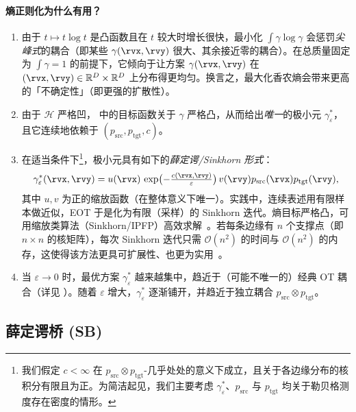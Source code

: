 \paragraph{熵正则化为什么有用？}
\begin{enumerate}
  \item {}
  由于 $t\mapsto t\log t$ 是凸函数且在 $t$ 较大时增长很快，最小化 $\int \gamma\log\gamma$
  会惩罚\emph{尖峰式}的耦合（即某些 $\gamma(\rvx,\rvy)$ 很大、其余接近零的耦合）。在总质量固定为 $\int \gamma=1$ 的前提下，它倾向于让方案 $\gamma(\rvx,\rvy)$ 在 $(\rvx,\rvy)\in\mathbb{R}^D\times\mathbb{R}^D$ 上分布得更均匀。换言之，最大化香农熵会带来更高的「不确定性」（即更强的扩散性）。

  \item {}
  由于 $\mathcal{H}$ 严格凹， 中的目标函数关于 $\gamma$ 严格凸，从而给出\emph{唯一}的极小元 $\gamma^*_\varepsilon$，且它连续地依赖于 $(p_{\mathrm{src}},p_{\mathrm{tgt}},c)$。

  \item {}
  在适当条件下\footnote{我们假定 $c<\infty$ 在 $p_{\mathrm{src}}\otimes p_{\mathrm{tgt}}$-几乎处处的意义下成立，且关于各边缘分布的核积分有限且为正。为简洁起见，我们主要考虑 $\gamma^*_\varepsilon$、$p_{\mathrm{src}}$ 与 $p_{\mathrm{tgt}}$ 均关于勒贝格测度存在密度的情形。}，极小元具有如下的\emph{薛定谔/Sinkhorn 形式}：
  \[
  \gamma^*_\varepsilon(\rvx,\rvy) = u(\rvx)\, \exp \bigl(-\tfrac{c(\rvx,\rvy)}{\varepsilon}\bigr)  \,v(\rvy)p_{\mathrm{src}}(\rvx) p_{\mathrm{tgt}}(\rvy),
  \]
  其中 $u,v$ 为正的缩放函数（在整体意义下唯一）。实践中，连续表述用有限样本做近似，EOT 于是化为有限（采样）的 Sinkhorn 迭代。熵目标严格凸，可用缩放类算法（Sinkhorn/IPFP）高效求解~\citep{sinkhorn1964relationship,cuturi2013sinkhorn}。若每条边缘有 $n$ 个支撑点（即 $n\times n$ 的核矩阵），每次 Sinkhorn 迭代只需 $\mathcal{O}(n^2)$ 的时间与 $\mathcal{O}(n^2)$ 的内存，这使得该方法更具可扩展性、也更为实用~\citep{altschuler2017near}。

  \item {}
当 $\varepsilon \to 0$ 时，最优方案 $\gamma^*_\varepsilon$ 越来越集中，趋近于（可能不唯一的）经典 OT 耦合（详见 ）。随着 $\varepsilon$ 增大，$\gamma^*_\varepsilon$ 逐渐铺开，并趋近于独立耦合 $p_{\mathrm{src}}\otimes p_{\mathrm{tgt}}$。
\end{enumerate}


\subsection{薛定谔桥 (SB)}\label{subsec:sb}


